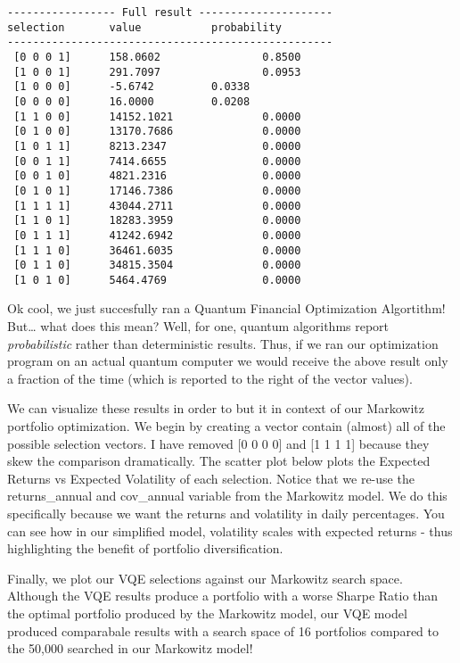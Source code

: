 \documentclass[11pt]{article}
\begin{document}
\begin{Verbatim}[commandchars=\\\{\}]
----------------- Full result ---------------------
selection       value           probability
---------------------------------------------------
 [0 0 0 1]      158.0602                0.8500
 [1 0 0 1]      291.7097                0.0953
 [1 0 0 0]      -5.6742         0.0338
 [0 0 0 0]      16.0000         0.0208
 [1 1 0 0]      14152.1021              0.0000
 [0 1 0 0]      13170.7686              0.0000
 [1 0 1 1]      8213.2347               0.0000
 [0 0 1 1]      7414.6655               0.0000
 [0 0 1 0]      4821.2316               0.0000
 [0 1 0 1]      17146.7386              0.0000
 [1 1 1 1]      43044.2711              0.0000
 [1 1 0 1]      18283.3959              0.0000
 [0 1 1 1]      41242.6942              0.0000
 [1 1 1 0]      36461.6035              0.0000
 [0 1 1 0]      34815.3504              0.0000
 [1 0 1 0]      5464.4769               0.0000
    \end{Verbatim}

    Ok cool, we just succesfully ran a Quantum Financial Optimization
Algortithm! But\ldots{} what does this mean? Well, for one, quantum
algorithms report \emph{probabilistic} rather than deterministic
results. Thus, if we ran our optimization program on an actual quantum
computer we would receive the above result only a fraction of the time
(which is reported to the right of the vector values).

We can visualize these results in order to but it in context of our
Markowitz portfolio optimization. We begin by creating a vector contain
(almost) all of the possible selection vectors. I have removed {[}0 0 0
0{]} and {[}1 1 1 1{]} because they skew the comparison dramatically.
The scatter plot below plots the Expected Returns vs Expected Volatility
of each selection. Notice that we re-use the returns\_annual and
cov\_annual variable from the Markowitz model. We do this specifically
because we want the returns and volatility in daily percentages. You can
see how in our simplified model, volatility scales with expected returns
- thus highlighting the benefit of portfolio diversification.

Finally, we plot our VQE selections against our Markowitz search space.
Although the VQE results produce a portfolio with a worse Sharpe Ratio
than the optimal portfolio produced by the Markowitz model, our VQE
model produced comparabale results with a search space of 16 portfolios
compared to the 50,000 searched in our Markowitz model!
\end{document}
